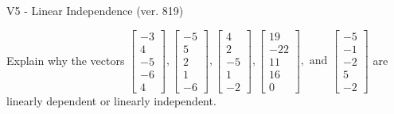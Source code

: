 \begin{exercise}
  \begin{exerciseTitle}V5 - Linear Independence (ver. 819)\end{exerciseTitle}
  \begin{exerciseStatement}
    Explain why the vectors \(\left[\begin{array}{r}
-3 \\
4 \\
-5 \\
-6 \\
4
\end{array}\right] , \left[\begin{array}{r}
-5 \\
5 \\
2 \\
1 \\
-6
\end{array}\right] , \left[\begin{array}{r}
4 \\
2 \\
-5 \\
1 \\
-2
\end{array}\right] , \left[\begin{array}{r}
19 \\
-22 \\
11 \\
16 \\
0
\end{array}\right] , \text{ and } \left[\begin{array}{r}
-5 \\
-1 \\
-2 \\
5 \\
-2
\end{array}\right]\) are linearly dependent or linearly independent.	



\end{exerciseStatement}
\end{exercise}

